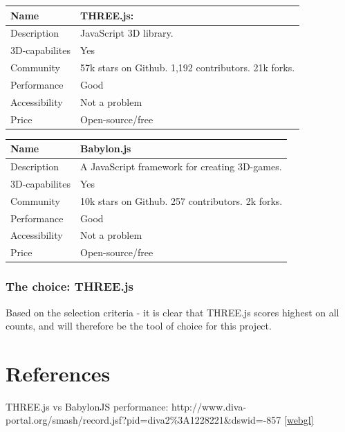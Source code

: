 \begin{longtable}[]{@{}ll@{}}
\toprule
Name & THREE.js:\tabularnewline
\midrule
\endhead
Description & JavaScript 3D library.\tabularnewline
3D-capabilites & Yes\tabularnewline
Community & 57k stars on Github. 1,192 contributors. 21k
forks.\tabularnewline
Performance & Good\tabularnewline
Accessibility & Not a problem\tabularnewline
Price & Open-source/free\tabularnewline
\bottomrule
\end{longtable}

\begin{longtable}[]{@{}ll@{}}
\toprule
Name & Babylon.js\tabularnewline
\midrule
\endhead
Description & A JavaScript framework for creating
3D-games.\tabularnewline
3D-capabilites & Yes\tabularnewline
Community & 10k stars on Github. 257 contributors. 2k
forks.\tabularnewline
Performance & Good\tabularnewline
Accessibility & Not a problem\tabularnewline
Price & Open-source/free\tabularnewline
\bottomrule
\end{longtable}

\hypertarget{the-choice-three.js}{%
\subsubsection{The choice: THREE.js}\label{the-choice-three.js}}

Based on the selection criteria - it is clear that THREE.js scores
highest on all counts, and will therefore be the tool of choice for this
project. \cite{WinNT}

\hypertarget{references}{%
\section{References}\label{references}}

\printbibliography{}

THREE.js vs BabylonJS performance:
http://www.diva-portal.org/smash/record.jsf?pid=diva2\%3A1228221\&dswid=-857
\ref{webgl}
